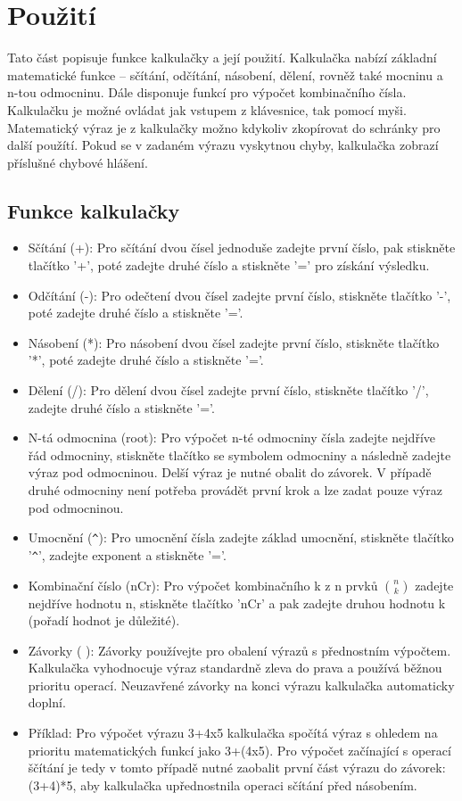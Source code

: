 \documentclass[a4paper, 11pt]{article}
\begin{document}
    \pagebreak
	\section{Použití}
        Tato část popisuje funkce kalkulačky a její použití. Kalkulačka nabízí základní matematické funkce -- sčítání, odčítání, násobení, dělení, rovněž také mocninu a n-tou odmocninu. Dále disponuje funkcí pro výpočet kombinačního čísla. Kalkulačku je možné ovládat jak vstupem z klávesnice, tak pomocí myši. Matematický výraz je z kalkulačky možno kdykoliv zkopírovat do schránky pro další použítí. Pokud se v zadaném výrazu vyskytnou chyby, kalkulačka zobrazí příslušné chybové hlášení. 
    \subsection*{Funkce kalkulačky}
    \begin{itemize}
        \item Sčítání (+): Pro sčítání dvou čísel jednoduše zadejte první číslo, pak stiskněte tlačítko '+', poté zadejte druhé číslo a stiskněte '=' pro získání výsledku.
        \item Odčítání (-): Pro odečtení dvou čísel zadejte první číslo, stiskněte tlačítko '-', poté zadejte druhé číslo a stiskněte '='.
        \item Násobení (*): Pro násobení dvou čísel zadejte první číslo, stiskněte tlačítko '*', poté zadejte druhé číslo a stiskněte '='.
        \item Dělení (/): Pro dělení dvou čísel zadejte první číslo, stiskněte tlačítko '/', zadejte druhé číslo a stiskněte '='.
        \item N-tá odmocnina (root): Pro výpočet n-té odmocniny čísla zadejte nejdříve řád odmocniny, stiskněte tlačítko se symbolem odmocniny a následně zadejte výraz pod odmocninou. Delší výraz je nutné obalit do závorek. V případě druhé odmocniny není potřeba provádět první krok a lze zadat pouze výraz pod odmocninou.
        \item Umocnění (\verb|^|): Pro umocnění čísla zadejte základ umocnění, stiskněte tlačítko '\verb|^|', zadejte exponent a stiskněte '='.
        \item Kombinační číslo (nCr): Pro výpočet kombinačního k z n prvků $\binom{n}{k}$ zadejte nejdříve hodnotu n, stiskněte tlačítko 'nCr' a pak zadejte druhou hodnotu k (pořadí hodnot je důležité).
        \item Závorky ( ): Závorky používejte pro obalení výrazů s přednostním výpočtem. Kalkulačka vyhodnocuje výraz standardně zleva do prava a používá běžnou prioritu operací. Neuzavřené závorky na konci výrazu kalkulačka automaticky doplní.
        \item Příklad: Pro výpočet výrazu 3+4x5 kalkulačka spočítá výraz s ohledem na prioritu matematických funkcí jako 3+(4x5). Pro výpočet začínající s operací ščítání je tedy v tomto případě nutné zaobalit první část výrazu do závorek: (3+4)*5, aby kalkulačka upřednostnila operaci sčítání před násobením.
    \end{itemize}
\end{document}
